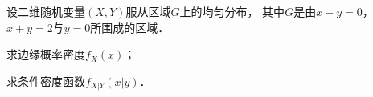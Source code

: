 \documentclass[plain,noanswer,medmath]{../../template/jnuexam}
\begin{document}






\begin{problem}[points=11]
设二维随机变量$(X,Y)$服从区域$G$上的均匀分布，
其中$G$是由$x - y = 0$，\goodbreak$x + y = 2$与$y = 0$所围成的区域．\par
\begin{enumerate*}
\item 求边缘概率密度$f_X(x)$；
\item 求条件密度函数$f_{X|Y}(x|y)$．
\end{enumerate*}
\end{problem}
\end{document}
